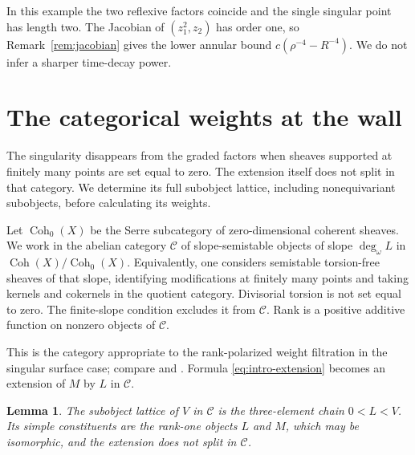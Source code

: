 \documentclass[11pt]{amsart}
\newtheorem{lemma}[theorem]{Lemma}
\theoremstyle{definition}
\theoremstyle{remark}
\newcommand{\Coh}{\operatorname{Coh}}
\begin{document}
In this example the two reflexive factors coincide and the single
singular point has length two. The Jacobian of $(z_1^2,z_2)$ has order
one, so Remark~\ref{rem:jacobian} gives the lower annular bound
$c(\rho^{-4}-R^{-4})$. We do not infer a sharper time-decay power.


\section{The categorical weights at the wall}\label{sec:weights}

The singularity disappears from the graded factors when sheaves supported
at finitely many points are set equal to zero. The extension itself does
not split in that category. We determine its full subobject lattice,
including nonequivariant subobjects, before calculating its weights.

Let $\Coh_0(X)$ be the Serre subcategory of zero-dimensional coherent
sheaves. We work in the abelian category $\mathcal C$ of slope-semistable
objects of slope $\deg_\omega L$ in $\Coh(X)/\Coh_0(X)$. Equivalently, one considers
semistable torsion-free sheaves of that slope, identifying modifications
at finitely many points and taking kernels and cokernels in the quotient
category. Divisorial torsion is not set equal to zero. The finite-slope
condition excludes it from $\mathcal C$. Rank is a positive additive
function on nonzero objects of $\mathcal C$.

This is the category appropriate to the rank-polarized weight filtration
in the singular surface case; compare \cite[Remark~8.3]{lam2026} and
\cite[\S4.1, equation~(4.3)]{hkkp2018}. Formula \eqref{eq:intro-extension} becomes an extension
of $M$ by $L$ in $\mathcal C$.

\begin{lemma}\label{lem:lattice}
The subobject lattice of $V$ in $\mathcal C$ is the three-element chain
$0<L<V$. Its simple constituents are the rank-one objects $L$
and $M$, which may be isomorphic, and the extension does not split in $\mathcal C$.
\end{lemma}
\end{document}
